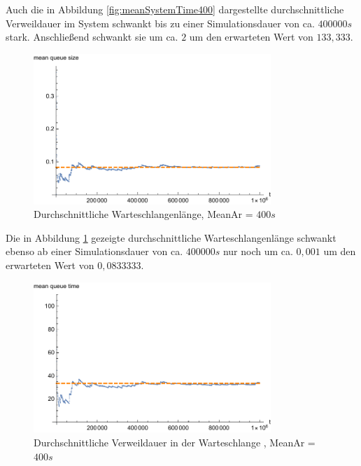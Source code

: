 Auch die in Abbildung \ref{fig:meanSystemTime400} dargestellte durchschnittliche Verweildauer im System schwankt bis zu einer Simulationsdauer von ca. $400000s$ stark. Anschließend schwankt sie um ca. $2$ um den erwarteten Wert von $133,333$.

\begin{figure}[htpb]
	\centering
	\includegraphics[width=0.8\textwidth]{abbildungen/1_Phone/Arrival_400_Serve_100_dur_1000000_Skip_0/MeanQueueSize.pdf}
	\caption{Durchschnittliche Warteschlangenlänge, MeanAr = $400s$}
	\label{fig:meanQueueSize400}
\end{figure}

Die in Abbildung \ref{fig:meanQueueSize400} gezeigte durchschnittliche Warteschlangenlänge schwankt ebenso ab einer Simulationsdauer von ca. $400000s$ nur noch um ca. $0,001$ um den erwarteten Wert von $0,0833333$.

\begin{figure}[htpb]
	\centering
	\includegraphics[width=0.8\textwidth]{abbildungen/1_Phone/Arrival_400_Serve_100_dur_1000000_Skip_0/MeanQueueTime.pdf}
	\caption{Durchschnittliche Verweildauer in der Warteschlange , MeanAr = $400s$}
	\label{fig:meanQueueTime400}
\end{figure} 

